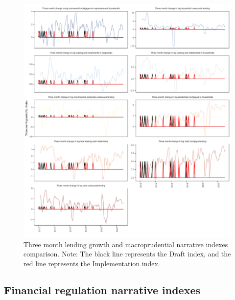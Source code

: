\documentclass[
  letterpaper,
  DIV=11,
  numbers=noendperiod]{scrartcl}
\begin{document}
\newpage

\begin{figure}[H]

{\centering \includegraphics{UP_paper_files/figure-pdf/fig-macro_narrative_indexes_three_month-1.pdf}

}

\caption{\label{fig-macro_narrative_indexes_three_month}Three month
lending growth and macroprudential narrative indexes comparison. Note:
The black line represents the Draft index, and the red line represents
the Implementation index.}

\end{figure}

\newpage

\hypertarget{financial-regulation-narrative-indexes}{%
\subsection{Financial regulation narrative
indexes}\label{financial-regulation-narrative-indexes}}
\end{document}
